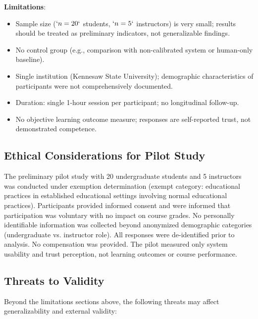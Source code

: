 \textbf{Limitations}:

\begin{itemize}
\item
  Sample size (\(`n=20`\) students, \(`n=5`\) instructors) is very small; results should be treated as preliminary indicators, not generalizable findings.
\item
  No control group (e.g., comparison with non-calibrated system or human-only baseline).
\item
  Single institution (Kennesaw State University); demographic characteristics of participants were not comprehensively documented.
\item
  Duration: single 1-hour session per participant; no longitudinal follow-up.
\item
  No objective learning outcome measure; responses are self-reported trust, not demonstrated competence.
\end{itemize}

\subsection{Ethical Considerations for Pilot Study}\label{ethical-considerations-for-pilot-study}

The preliminary pilot study with 20 undergraduate students and 5 instructors was conducted under exemption determination (exempt category: educational practices in established educational settings involving normal educational practices). Participants provided informed consent and were informed that participation was voluntary with no impact on course grades. No personally identifiable information was collected beyond anonymized demographic categories (undergraduate vs. instructor role). All responses were de-identified prior to analysis. No compensation was provided. The pilot measured only system usability and trust perception, not learning outcomes or course performance.

\subsection{Threats to Validity}\label{threats-to-validity}

Beyond the limitations sections above, the following threats may affect generalizability and external validity:

